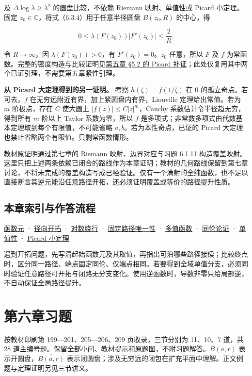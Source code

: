 \documentclass[11pt,a4paper]{article}
\begin{document}
及 \(\Delta\log\lambda\ge\lambda^2\) 的圆盘比较，不依赖 Riemann
映射、单值性或 Picard 小定理。固定
\(z_0\in\mathbb C\)，将式（6.3.4）用于任意半径圆盘 \(B(z_0,R)\)
的中心，得

\[
0\le\lambda(F(z_0))|F'(z_0)|\le\frac2R.
\]

令 \(R\to\infty\)，因 \(\lambda(F(z_0))>0\)，有 \(F'(z_0)=0\)。\(z_0\)
任意，所以 \(F\) 及 \(f\)
为常函数。完整的密度构造与比较证明见\href{/notes/c463439a440b0b9ea4b53175/\#定理-526picard-大定理}{第五章
§5.2 的 Picard 补证}；此处仅复用其中两个已证引理，不需要第五章紧性引理。

\textbf{从 Picard 大定理得到的另一证明。} 考察 \(h(\zeta)=f(1/\zeta)\)
在 \(0\) 的孤立奇点。若可去，\(f\)
在无穷远附近有界，加上紧圆盘内有界，Liouville 定理给出常值。若为 \(m\)
阶极点，存在 \(C\) 使大圆上 \(|f(z)|\le C|z|^m\)，Cauchy
系数估计令半径趋无穷，得到所有 \(m\) 阶以上 Taylor 系数为零，所以 \(f\)
是多项式；非常数多项式由代数基本定理取到每个有限值，不可能省略
\(a,b\)。若为本性奇点，已证的 Picard
大定理也禁止省略两个有限值。只剩常函数情形。

教材原证明通过第七章的 Riemann 映射、边界对应与习题 6.1.11
构造覆盖映射。这里只把上述两条依赖已闭合的路线作为本章证明；教材的几何路线保留到第七章讨论，不将未完成的覆盖构造写成已经验证。仅有一个满射的全纯函数，也不足以直接断言其逆元能沿任意路径开拓，还必须证明覆盖或等价的路径提升性质。

\subsection{本章索引与作答流程}\label{ch06-s3-heading-9}

\hyperref[ch06-s3-heading-1]{函数元} · \hyperref[ch06-s3-heading-2]{径向开拓} ·
\hyperref[ch06-s3-heading-3]{对数绕行} · \hyperref[ch06-s3-heading-4]{固定路径唯一性} ·
\hyperref[ch06-s3-heading-5]{多值函数} · \hyperref[ch06-s3-heading-6]{同伦论证} ·
\hyperref[ch06-s3-heading-7]{单值性} · \hyperref[ch06-s3-heading-8]{Picard 小定理}

遇到开拓问题，先写清起始函数元及其取值，再指出可沿哪些路径接续；比较终点时，区分同一路径、端点固定同伦、仅端点相同。若要得到全域单值分支，必须同时验证任意路径可开拓与闭路无分支变化。使用逆函数时，导数非零只给局部逆，不自动保证全局路径提升。

\clearpage\section*{第六章习题}
按教材印刷第 199---201、205---206、209 页收录，三节分别为 11、10、7
道，共 28
道主编号题。保留全部小问、教材提示和原题图，不附习题解答。\(B(a,r)\)
表示开圆盘，\(\overline{B(a,r)}\)
表示闭圆盘；涉及无穷远的闭包在扩充平面中理解。正文例题与定理证明另见三节讲义。
\end{document}
